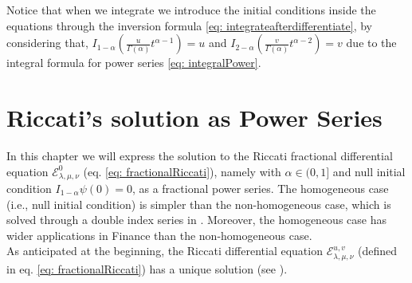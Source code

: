 \documentclass[a4paper,italian,11pt]{book}
\theoremstyle{plain}
\theoremstyle{remark}
\theoremstyle{plain}
\begin{document}
Notice that when we integrate we introduce the initial conditions inside the equations through the inversion formula \eqref{eq: integrateafterdifferentiate}, by considering that, $I_{1-\alpha} \left( \frac{u}{\Gamma(\alpha)} t^{\alpha-1} \right) = u$ and $I_{2-\alpha} \left( \frac{v}{\Gamma(\alpha)} t^{\alpha-2} \right) = v$ due to the integral formula for power series \eqref{eq: integralPower}.



\chapter{Riccati's solution as Power Series }
In this chapter we will express the solution to the Riccati fractional differential equation $\mathcal{E} ^ 0 _ {\lambda, \mu ,\nu}$ (eq. \eqref{eq: fractionalRiccati}), namely with $\alpha\in (0,1]$ and null initial condition $I_{1-\alpha} \psi(0)=0$, as a fractional power series. The homogeneous case (i.e., null initial condition) is simpler than the non-homogeneous case, which is solved through a double index series in \cite{Main}. 
Moreover, the homogeneous case has wider applications in Finance than the non-homogeneous case. \\
As anticipated at the beginning, the Riccati differential equation $\mathcal{E} ^ {u,v}_ {\lambda, \mu ,\nu}$ (defined in eq. \eqref{eq: fractionalRiccati}) has a unique solution (see \cite{Omar}). 
\end{document}
